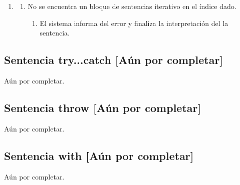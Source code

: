 \begin{framed}
\begin{description}
\begin{enumerate}
   \end{enumerate}
   \begin{enumerate} \itemsep1pt \parskip0pt 
   \setcounter{enumi}{2}
   \renewcommand{\labelenumi}{}
   \renewcommand{\labelenumiii}{\arabic{enumiii}.}
   \renewcommand{\labelenumii}{\arabic{enumi}\alph{enumii}.}
      \item 
      \begin {enumerate}
         \setcounter{enumii}{0}
         \item No se encuentra un bloque de sentencias iterativo en el índice dado.
         \begin{enumerate}
         \item El sistema informa del error y finaliza la interpretación del 
         la sentencia.
         \end{enumerate}
      \end{enumerate}
   \end{enumerate}
\end{description}
 \FloatBarrier
\end{framed}
\subsection {Sentencia try...catch [Aún por completar]}
Aún por completar.
\subsection {Sentencia throw [Aún por completar]}
Aún por completar.
\subsection {Sentencia with [Aún por completar]}
Aún por completar.

\pagebreak

